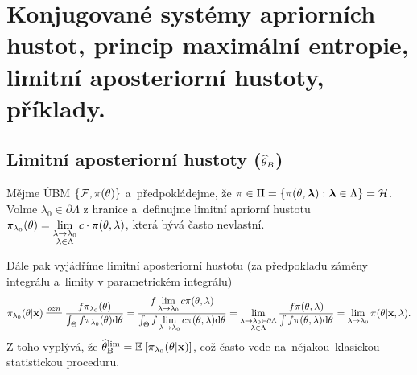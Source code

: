 \chapter{Konjugované systémy apriorních hustot, princip maximální entropie, limitní aposteriorní hustoty, příklady.}

\section{Limitní aposteriorní hustoty ($\widehat{\theta}_B$)}
Mějme ÚBM $\{\mathcal{F},\pi(\theta)\}$ a~předpokládejme, že $\pi\in\Pi=\{\pi(\theta,\boldsymbol{\lambda}):\boldsymbol{\lambda}\in\Lambda\}=\mathcal{H}$. Volme $\lambda_0\in\partial\Lambda$ z hranice a~definujme limitní apriorní hustotu $\pi_{\lambda_0}(\theta)=\lim\limits_{\substack{
		\lambda\to\lambda_0\\\lambda\in\Lambda	}
}c\cdot \pi(\theta,\lambda)$, která bývá často nevlastní. 

Dále pak vyjádříme limitní aposteriorní hustotu (za předpokladu záměny integrálu a~limity v parametrickém integrálu) $$\pi_{\lambda_0}(\t|\textbf{x})\equal{ozn}\frac{f\pi_{\lambda_0}(\t)}{\int_\Theta f\pi_{\lambda_0}(\t)\d\t}=\frac{f\lim\limits_{\lambda\to\lambda_0}c\pi(\t,\lambda)}{\int_\Theta f\lim\limits_{\lambda\to\lambda_0}c\pi(\t,\lambda) \d\t}=\lim\limits_{\substack{
		\lambda\to\lambda_0\in\partial\Lambda\\\lambda\in\Lambda	}
}\frac{f\pi(\t,\lambda)}{\int f\pi(\t,\lambda)\d\t}=\lim\limits_{\lambda\to\lambda_0}\pi(\t|\textbf{x},\lambda).$$
Z toho vyplývá, že $\widehat{\theta}_{\mathrm{{\footnotesize B }}}^\mathrm{lim} =\mathbb{E}\left[ \pi_{\lambda_0}(\theta|\textbf{x}) \right]$, což často vede na~nějakou~klasickou statistickou proceduru.

